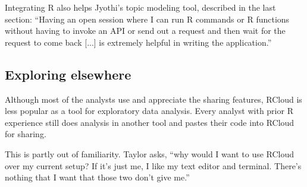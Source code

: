 Integrating R also helps Jyothi's topic modeling tool, described in the
last section: ``Having an open session where I can run R commands or R
functions without having to invoke an API or send out a request and then
wait for the request to come back [...] is extremely helpful in writing the
application.''




\subsection{Exploring elsewhere}

Although most of the analysts use and appreciate the sharing features,
RCloud is less popular as a tool for exploratory data analysis. Every
analyst with prior R experience still does analysis in another tool and
pastes their code into RCloud for sharing.

This is partly out of familiarity. Taylor asks, ``why would I want to use
RCloud over my current setup? If it's just me, I like my text editor and
terminal. There's nothing that I want that those two don't give me.''




